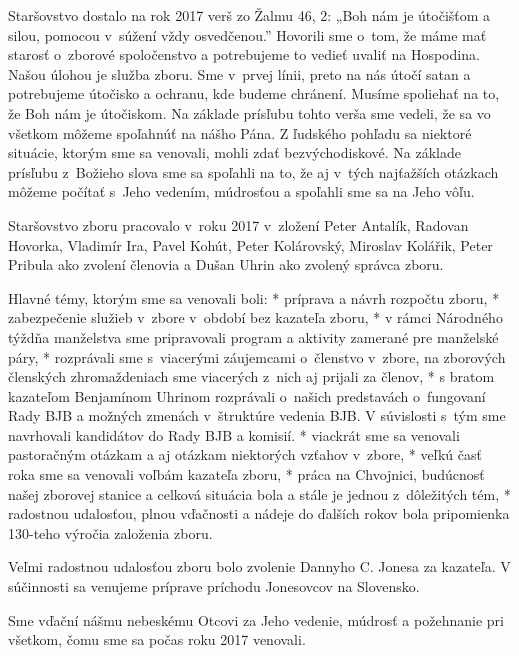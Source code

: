 
Staršovstvo dostalo na rok 2017 verš  zo Žalmu 46, 2: „Boh nám je útočišťom a silou, pomocou v~súžení vždy osvedčenou.” Hovorili sme o~tom, že máme mať starosť o~zborové spoločenstvo a potrebujeme to vedieť uvaliť na Hospodina. Našou úlohou je služba zboru.  Sme v~prvej línii, preto na nás útočí satan a potrebujeme útočisko a ochranu, kde budeme chránení. Musíme spoliehať na to, že Boh nám je útočiskom. Na základe prísľubu tohto verša sme vedeli, že sa vo všetkom môžeme spoľahnúť na nášho Pána. Z ľudského pohľadu sa niektoré situácie, ktorým sme sa venovali, mohli zdať bezvýchodiskové. Na základe prísľubu z~Božieho slova sme sa spoľahli na to, že aj v~tých najťažších otázkach môžeme počítať s~Jeho vedením, múdrosťou a spoľahli sme sa na Jeho vôľu.

Staršovstvo zboru pracovalo v~roku 2017 v~zložení Peter Antalík, Radovan Hovorka, Vladimír Ira, Pavel Kohút, Peter Kolárovský, Miroslav Kolářik, Peter Pribula ako zvolení členovia a Dušan Uhrin ako zvolený správca zboru.

Hlavné témy, ktorým sme sa venovali boli:
\begitems
* príprava a návrh rozpočtu zboru,
* zabezpečenie služieb v~zbore v~období bez kazateľa zboru,
* v rámci Národného týždňa manželstva sme pripravovali program a aktivity zamerané pre manželské páry,
* rozprávali sme s~viacerými záujemcami o~členstvo v~zbore, na zborových členských zhromaždeniach sme viacerých z~nich aj prijali za členov,
* s bratom kazateľom Benjamínom Uhrinom rozprávali o~našich predstavách o~fungovaní Rady BJB a možných zmenách v~štruktúre vedenia BJB. V súvislosti s~tým sme navrhovali kandidátov do Rady BJB a komisií.
* viackrát sme sa venovali pastoračným otázkam a aj otázkam niektorých vzťahov v~zbore,
* veľkú časť roka sme sa venovali voľbám kazateľa zboru,
* práca na Chvojnici, budúcnosť našej zborovej stanice a celková situácia bola a stále je jednou z~dôležitých tém,
* radostnou udalosťou, plnou vďačnosti a nádeje do ďalších rokov bola pripomienka 130-teho výročia založenia zboru.
\enditems

Veľmi radostnou udalosťou zboru bolo zvolenie Dannyho C. Jonesa za kazateľa. V súčinnosti sa venujeme príprave príchodu Jonesovcov na Slovensko.

Sme vďační nášmu nebeskému Otcovi za Jeho vedenie, múdrosť a požehnanie pri všetkom, čomu sme sa počas roku 2017 venovali.



